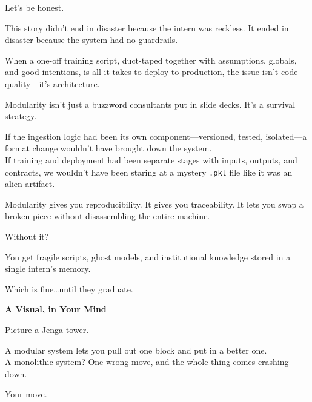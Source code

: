 Let’s be honest.

This story didn’t end in disaster because the intern was reckless.  It ended in disaster because the system had no guardrails.

When a one-off training script, duct-taped together with assumptions, globals, and good intentions, is all it takes to deploy to production, the issue isn’t code quality---it’s architecture.

Modularity isn’t just a buzzword consultants put in slide decks.  It’s a survival strategy.

If the ingestion logic had been its own component---versioned, tested, isolated---a format change wouldn’t have brought down the system.\\
If training and deployment had been separate stages with inputs, outputs, and contracts, we wouldn’t have been staring at a mystery \texttt{.pkl} file like it was an alien artifact.

Modularity gives you reproducibility.  It gives you traceability. It lets you swap a broken piece without disassembling the entire machine.

Without it?

You get fragile scripts, ghost models, and institutional knowledge stored in a single intern’s memory.

Which is fine\ldots until they graduate.


\vspace{1em}
\textbf{A Visual, in Your Mind}

Picture a Jenga tower.

A modular system lets you pull out one block and put in a better one.\\
A monolithic system? One wrong move, and the whole thing comes crashing down.

Your move.







